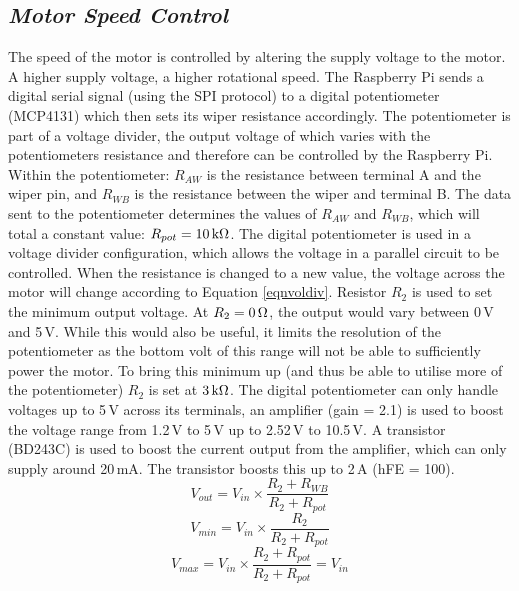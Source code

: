 \documentclass[twoside,a4]{report}
\def\br{\newline \newline \noindent}
\begin{document}
	\subsection*{\textit{Motor Speed Control}} %
	The speed of the motor is controlled by altering the supply voltage to the motor. A higher supply voltage, a higher rotational speed. The Raspberry Pi sends a digital serial signal (using the SPI protocol) to a digital potentiometer (MCP4131) which then sets its wiper resistance accordingly. The potentiometer is part of a voltage divider, the output voltage of which varies with the potentiometers resistance and therefore can be controlled by the Raspberry Pi.\br
	Within the potentiometer: \(R_{AW}\) is the resistance between terminal A and the wiper pin, and \(R_{WB}\) is the resistance between the wiper and terminal B. The data sent to the potentiometer determines the values of \(R_{AW}\) and \(R_{WB}\), which will total a constant value: \(R_{pot} = 10\,{\rm k\Omega} \). The digital potentiometer is used in a voltage divider configuration, which allows the voltage in a parallel circuit to be controlled. When the resistance is changed to a new value, the voltage across the motor will change according to Equation \ref{eqnvoldiv}. Resistor \(R_2\) is used to set the minimum output voltage. At \(R_2 = 0\,{\rm\Omega}\), the output would vary between 0\,V and 5\,V. While this would also be useful, it limits the resolution of the potentiometer as the bottom volt of this range will not be able to sufficiently power the motor. To bring this minimum up (and thus be able to utilise more of the potentiometer) \(R_2\) is set at \(3\,{\rm k\Omega} \). The digital potentiometer can only handle voltages up to 5\,V across its terminals, an amplifier (gain = 2.1) is used to boost the voltage range from 1.2\,V to 5\,V up to 2.52\,V to 10.5\,V. A transistor (BD243C) is used to boost the current output from the amplifier, which can only supply around 20\,mA. The transistor boosts this up to 2\,A (hFE = 100).
	\begin{equation}
	V_{out} = V_{in}\times \frac{R_2 + R_{WB}}{R_2 + R_{pot}}
	\label{eqnvoldiv}
	\end{equation}
	\begin{equation}
	V_{min} = V_{in}\times \frac{R_2}{R_2 + R_{pot}}
	\label{eqnminvol}
	\end{equation}
	\begin{equation}
	V_{max} = V_{in}\times \frac{R_2 + R_{pot}}{R_2 + R_{pot}} = V_{in}
	\label{eqnmaxvol}
	\end{equation}
	
\end{document}
